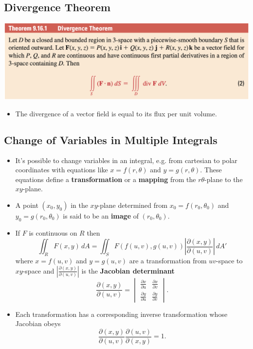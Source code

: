 \documentclass{article}
\begin{document}
\subsection{Divergence Theorem}

\includegraphics[scale=0.443]{divergence-theorem}

\begin{itemize}
  \item The divergence of a vector field is equal to its flux per unit volume.
\end{itemize}

\subsection{Change of Variables in Multiple Integrals}

\begin{itemize}
  \item It's possible to change variables in an integral, e.g. from cartesian to polar coordinates with equations like $x = f(r, \theta)$ and $y = g(r, \theta)$. These equations define a \textbf{transformation} or a \textbf{mapping} from the $r\theta$-plane to the $xy$-plane.

  \item A point $(x_0, y_0)$ in the $xy$-plane determined from $x_0 = f(r_0, \theta_0)$ and $y_0 = g(r_0, \theta_0)$ is said to be an \textbf{image} of $(r_0, \theta_0)$.

  \item If $F$ is continuous on $R$ then \[\iint_R F(x, y) \,dA = \iint_S F(f(u, v), g(u, v)) \left|\frac{\partial (x, y)}{\partial (u, v)}\right| \,dA'\] where $x = f(u, v)$ and $y = g(u, v)$ are a transformation from $uv$-space to $xy$-space and $\left| \frac{\partial (x, y)}{\partial (u, v)} \right|$ is the \textbf{Jacobian determinant} \[\frac{\partial (x, y)}{\partial (u, v)} = \begin{vmatrix}
            \frac{\partial x}{\partial u} & \frac{\partial x}{\partial v} \\
            \frac{\partial y}{\partial u} & \frac{\partial y}{\partial v}
          \end{vmatrix}.\]

  \item Each transformation has a corresponding inverse transformation whose Jacobian obeys \[\frac{\partial (x, y)}{\partial (u, v)} \frac{\partial (u, v)}{\partial (x, y)} = 1.\]
\end{itemize}
\end{document}
